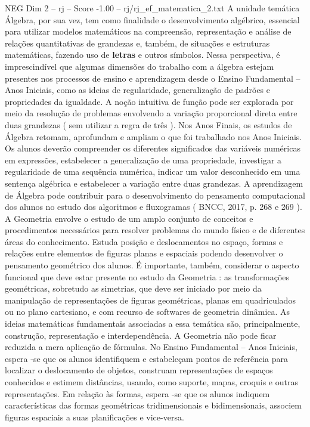 \begin{textsample}{NEG Dim 2 – rj – Score -1.00 – rj/rj\_ef\_matematica\_2.txt}
A unidade temática Álgebra, por sua vez, tem como finalidade o desenvolvimento algébrico, essencial para utilizar modelos matemáticos na compreensão, representação e análise de relações quantitativas de grandezas e, também, de situações e estruturas matemáticas, fazendo uso de \textbf{letras} e outros símbolos.
Nessa perspectiva, é imprescindível que algumas dimensões do trabalho com a álgebra estejam presentes nos processos de ensino e aprendizagem desde o Ensino Fundamental – Anos Iniciais, como as ideias de regularidade, generalização de padrões e propriedades da igualdade.
A noção intuitiva de função pode ser explorada por meio da resolução de problemas envolvendo a variação proporcional direta entre duas grandezas ( sem utilizar a regra de três ).
Nos Anos Finais, os estudos de Álgebra retomam, aprofundam e ampliam o que foi trabalhado nos Anos Iniciais.
Os alunos deverão compreender os diferentes significados das variáveis numéricas em expressões, estabelecer a generalização de uma propriedade, investigar a regularidade de uma sequência numérica, indicar um valor desconhecido em uma sentença algébrica e estabelecer a variação entre duas grandezas.
A aprendizagem de Álgebra pode contribuir para o desenvolvimento do pensamento computacional dos alunos no estudo dos algoritmos e fluxogramas ( BNCC, 2017, p. 268 e 269 ).
A Geometria envolve o estudo de um amplo conjunto de conceitos e procedimentos necessários para resolver problemas do mundo físico e de diferentes áreas do conhecimento.
Estuda posição e deslocamentos no espaço, formas e relações entre elementos de figuras planas e espaciais podendo desenvolver o pensamento geométrico dos alunos.
É importante, também, considerar o aspecto funcional que deve estar presente no estudo da Geometria : as transformações geométricas, sobretudo as simetrias, que deve ser iniciado por meio da manipulação de representações de figuras geométricas, planas em quadriculados ou no plano cartesiano, e com recurso de softwares de geometria dinâmica.
As ideias matemáticas fundamentais associadas a essa temática são, principalmente, construção, representação e interdependência.
A Geometria não pode ficar reduzida a mera aplicação de fórmulas.
No Ensino Fundamental – Anos Iniciais, espera -se que os alunos identifiquem e estabeleçam pontos de referência para localizar o deslocamento de objetos, construam representações de espaços conhecidos e estimem distâncias, usando, como suporte, mapas, croquis e outras representações.
Em relação às formas, espera -se que os alunos indiquem características das formas geométricas tridimensionais e bidimensionais, associem figuras espaciais a suas planificações e vice-versa.

\end{textsample}
